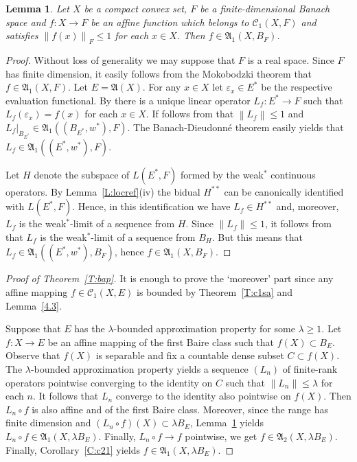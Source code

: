 \documentclass{amsart}
\numberwithin{equation}{section}
\newtheorem{lemma}[thm]{Lemma}
\theoremstyle{definition}
\def\fra{\mathfrak{A}}
\def\C{\mathcal C}
\def\ep{\varepsilon}
\def\r{|}
\newcommand{\norm}[1]{\left\|#1\right\|}
\begin{document}
\begin{lemma}\label{L:mok-fin}
Let $X$ be a compact convex set, $F$ be a finite-dimensional Banach space and $f:X\to F$ be an affine function which belongs to $\C_1(X,F)$ and satisfies $\norm{f(x)}_F\le1$ for each $x\in X$. Then $f\in\fra_1(X,B_F)$.
\end{lemma}

\begin{proof} Without loss of generality we may suppose that $F$ is a real space. Since $F$ has finite dimension, it easily follows from the Mokobodzki theorem that $f\in\fra_1(X,F)$. Let $E=\fra(X)$. For any $x\in X$ let $\ep_x\in E^*$ be the respective evaluation functional. By \cite[Lemma 2.2]{affperf} there is a unique linear operator $L_f:E^*\to F$ such that
$L_f(\ep_x)=f(x)$ for each $x\in X$. If follows from \cite[Lemma 2.3]{affperf} that $\norm{L_f}\le 1$ and $L_f\r_{B_{E^*}}\in\fra_1((B_{E^*},w^*),F)$. The Banach-Dieudonn\'e theorem easily yields that $L_f\in\fra_1((E^*,w^*),F)$.

Let $H$ denote the subspace of $L(E^*,F)$ formed by the weak$^*$ continuous operators. By Lemma~\ref{L:locref}(iv) the bidual $H^{**}$ can be canonically identified with $L(E^*,F)$. Hence, in this identification we have $L_f\in H^{**}$ and, moreover,
$L_f$ is the weak$^*$-limit of a sequence from $H$. Since $\|L_f\|\le1$, it follows from \cite[Remark on p. 379]{odro} that $L_f$ is the weak$^*$-limit of a sequence from $B_H$. But this means that $L_f\in\fra_1((E^*,w^*),B_F)$, hence $f\in\fra_1(X,B_F)$.
\end{proof}

\begin{proof}[Proof of Theorem~\ref{T:bap}] It is enough to prove the `moreover' part since any affine mapping $f\in\C_1(X,E)$ is bounded by Theorem~\ref{T:c1sa} and Lemma~\ref{4.3}.

 Suppose that $E$ has the $\lambda$-bounded approximation property for some $\lambda\ge 1$. Let $f:X\to E$ be an affine mapping of the first Baire class such that $f(X)\subset B_E$. Observe that $f(X)$ is separable and fix a countable dense subset $C\subset f(X)$. The  $\lambda$-bounded approximation property yields a sequence $(L_n)$ of finite-rank operators pointwise converging to the identity on $C$ such that $\norm{L_n}\le\lambda$ for each $n$. It follows that $L_n$ converge to the identity also pointwise on $f(X)$.  Then $L_n\circ f$ is also affine and of the first Baire class. Moreover, since the range has finite dimension and $(L_n\circ f)(X)\subset\lambda B_E$, Lemma~\ref{L:mok-fin} yields $L_n\circ f\in\fra_1(X,\lambda B_E)$. Finally, $L_n\circ f\to f$ pointwise, we get $f\in\fra_2(X,\lambda B_E)$. Finally, Corollary~\ref{C:c21} yields $f\in\fra_1(X,\lambda B_E)$.
\end{proof}
\end{document}
